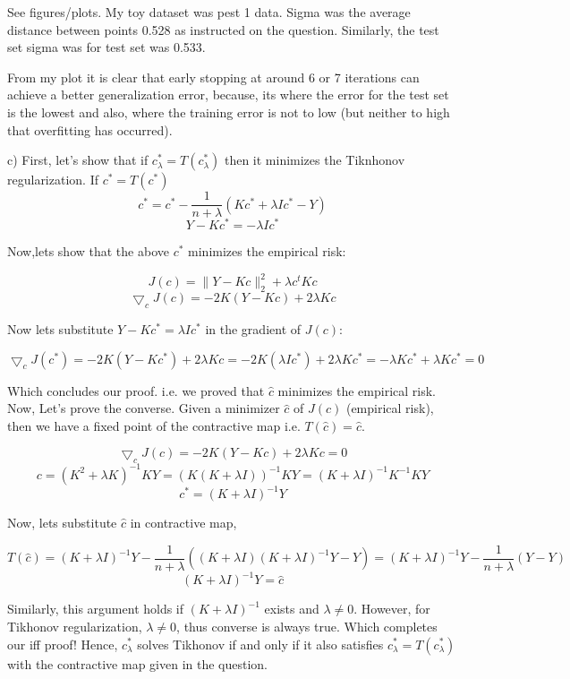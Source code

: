 \documentclass[12pt]{report}
\begin{document}
 See figures/plots. My toy dataset was pest 1 data. Sigma was the average distance between points 0.528 as instructed on the question. Similarly, the test set sigma was for test set was 0.533.

From my plot it is clear that early stopping at around 6 or 7 iterations can achieve a better generalization error, because, its where the error for the test set is the lowest and also, where the training error is not to low (but neither to high that overfitting has occurred).


c) First, let's show that if $c_{\lambda}^* = T(c_{\lambda}^*)$  then it minimizes the Tiknhonov regularization.
If $ c^* = T(c^*) $ 
$$ c^* = c^* - \frac{1}{n+\lambda}(Kc^*+\lambda Ic^*-Y) $$
$$ Y - Kc^* = - \lambda Ic^* $$

Now,lets show that the above $c^*$ minimizes the empirical risk:

$$ J(c) = \|Y-Kc\|_2^2 + \lambda c^t K c $$
$$ \bigtriangledown_c J(c) = -2K(Y-Kc) + 2\lambda K c $$

Now lets substitute $Y-Kc^* = \lambda I c^*$ in the gradient of $J(c)$:

$$\bigtriangledown_c J(c^*) = -2K(Y-Kc^*) + 2\lambda K c  = -2K(\lambda I c^*) + 2\lambda K c^* = - \lambda K c^* + \lambda K c^* = 0 $$

Which concludes our proof. i.e. we proved that $\hat{c}$ minimizes the empirical risk. \\

Now, Let's prove the converse. Given a minimizer $\hat{c}$ of $J(c)$ (empirical risk), then we have a fixed point of the contractive map i.e. $T(\hat{c}) = \hat{c}$.

$$ \bigtriangledown_c J(c) = -2K(Y-Kc) + 2\lambda K c = 0 $$
$$ c = (K^2 + \lambda K)^{-1}KY = (K(K + \lambda I))^{-1}KY = (K + \lambda I)^{-1}K^{-1}KY $$
$$ c^* = (K + \lambda I)^{-1} Y $$

Now, lets substitute $\hat{c}$ in contractive map,

$$ T(\hat{c}) = (K + \lambda I)^{-1} Y - \frac{1}{n+\lambda}((K + \lambda I)(K + \lambda I)^{-1} Y-Y) = (K + \lambda I)^{-1} Y - \frac{1}{n+\lambda}(Y-Y) $$
$$ (K + \lambda I)^{-1} Y = \hat{c}$$

Similarly, this argument holds if $(K + \lambda I)^{-1}$ exists and $\lambda \neq 0$. However, for Tikhonov regularization, $\lambda \neq 0$, thus converse is always true. Which completes our iff proof! Hence, $c_{\lambda}^*$ solves Tikhonov if and only if it also satisfies $c_{\lambda}^* = T(c_{\lambda}^*)$ with the contractive map given in the question. \\
\end{document}
